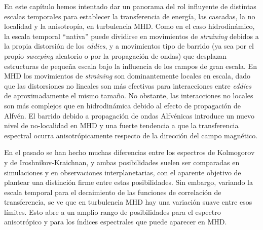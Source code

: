 En este capítulo hemos intentado dar un panorama del rol influyente de
distintas escalas temporales para establecer la transferencia de
energía, las cascadas, la no localidad y la anisotropía, en
turbulencia MHD. Como en el caso hidrodinámico, la escala temporal
``nativa'' puede dividirse en movimientos de \textit{straining}
debidos a la propia distorsión de los \textit{eddies}, y a movimientos
tipo de barrido (ya sea por el propio \textit{sweeping} aleatorio o
por la propagación de ondas) que desplazan estructuras de pequeña
escala bajo la influencia de los campos de gran escala. En MHD los
movimientos de \textit{straining} son dominantemente locales en
escala, dado que las distorsiones no lineales son más efectivas para
interacciones entre \textit{eddies} de aproximadamente el mismo
tamaño. No obstante, las interacciones no locales son más
complejos que en hidrodinámica debido al efecto de propagación de
Alfv\'en. El barrido debido a propagación de ondas Alfv\'enicas
introduce un nuevo nivel de no-localidad en MHD y una fuerte tendencia
a que la transferencia espectral ocurra anisotrópicamente respecto de
la dirección del campo magnético.

En el pasado se han hecho muchas diferencias entre los espectros de
Kolmogorov y de Iroshnikov-Kraichnan, y ambas posibilidades suelen ser
comparadas en simulaciones y en observaciones interplanetarias, con el
aparente objetivo de plantear una distinción firme entre estas
posibilidades. Sin embargo, variando la escala temporal para el
decaimiento de las funciones de correlación de transferencia, se ve
que en turbulencia MHD hay una variación suave entre esos límites.
Esto abre a un
amplio rango de posibilidades para el espectro anisotrópico y para los
índices espectrales que puede aparecer en MHD.

